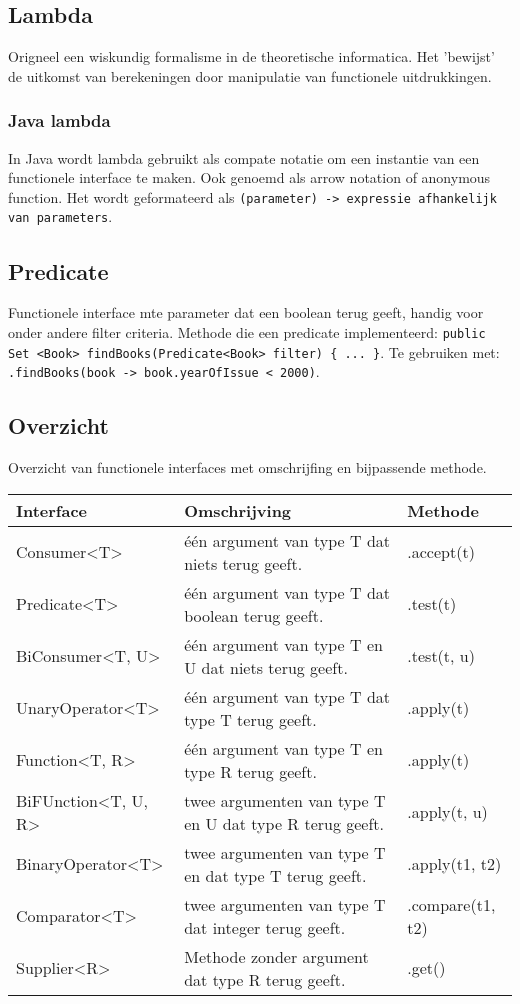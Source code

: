 \subsection{Lambda}
Origneel een wiskundig formalisme in de theoretische informatica.
Het 'bewijst' de uitkomst van berekeningen door manipulatie van functionele uitdrukkingen.

\subsubsection{Java lambda}
In Java wordt lambda gebruikt als compate notatie om een instantie van een functionele interface te maken.
Ook genoemd als arrow notation of anonymous function.
Het wordt geformateerd als \texttt{(parameter) -> expressie afhankelijk van parameters}.

\subsection{Predicate}
Functionele interface mte parameter dat een boolean terug geeft, handig voor onder andere filter criteria.
Methode die een predicate implementeerd: \texttt{public Set <Book> findBooks(Predicate<Book> filter) \{ ... \}}.
Te gebruiken met: \texttt{.findBooks(book -> book.yearOfIssue < 2000)}.

\subsection{Overzicht}
Overzicht van functionele interfaces met omschrijfing en bijpassende methode.
\begin{center}
    \begin{longtable}{lp{5cm}l}
        Interface   & Omschrijving & Methode \\
        \midrule
        Consumer<T>         & \'e\'en argument van type T dat niets terug geeft.        & .accept(t) \\
        Predicate<T>        & \'e\'en argument van type T dat boolean terug geeft.      & .test(t) \\
        BiConsumer<T, U>    & \'e\'en argument van type T en U dat niets terug geeft.   & .test(t, u) \\
        UnaryOperator<T>    & \'e\'en argument van type T dat type T terug geeft.       & .apply(t) \\
        Function<T, R>      & \'e\'en argument van type T en type R terug geeft.        & .apply(t) \\
        BiFUnction<T, U, R> & twee argumenten van type T en U dat type R terug geeft.   & .apply(t, u) \\
        BinaryOperator<T>   & twee argumenten van type T en dat type T terug geeft.     & .apply(t1, t2) \\
        Comparator<T>       & twee argumenten van type T dat integer terug geeft.       & .compare(t1, t2) \\
        Supplier<R>         & Methode zonder argument dat type R terug geeft.           & .get() \\
        \bottomrule
    \end{longtable}
\end{center}

